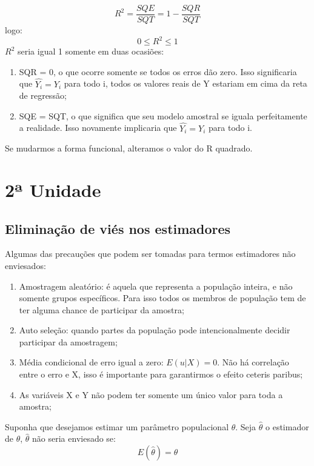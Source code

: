 \documentclass[12pt,a4paper,oneside,brazil]{abntex2}
\begin{document}
 \begin{equation}\label{R quadrado}
 R^2 = \frac{SQE}{SQT} = 1- \frac{SQR}{SQT}
 \end{equation}
 logo:
 \[ 0 \leq R^2 \leq 1\]
 $R^2$ seria igual 1 somente em duas ocasiões:
 \begin{enumerate}
 \item SQR = 0, o que ocorre somente se todos os erros dão zero. Isso significaria que $\hat{Y_i} = Y_i$ para todo i, todos os valores reais de Y estariam em cima da reta de regressão;
 \item SQE = SQT, o que significa que seu modelo amostral se iguala perfeitamente a realidade. Isso novamente implicaria que $\hat{Y_i} = Y_i$ para todo i.
 \end{enumerate}
 
 Se mudarmos a forma funcional, alteramos o valor do R quadrado.

\chapter{2ª Unidade}

\section{Eliminação de viés nos estimadores} 
Algumas das precauções que podem ser tomadas para termos estimadores não enviesados:

\begin{enumerate}
  \item Amostragem aleatório: é aquela que representa a população inteira, e não somente grupos específicos. Para isso todos os membros de  população tem de ter alguma chance de participar da amostra;
  \item Auto seleção: quando partes da população pode intencionalmente decidir participar da amostragem;
  \item Média condicional de erro igual a zero: $E(u|X) = 0$. Não há correlação entre o erro e X, isso é importante para garantirmos o efeito ceteris paribus;
  \item As variáveis X e Y não podem ter somente um único valor para toda a amostra;

\end{enumerate}

Suponha que desejamos estimar um parâmetro populacional $\theta$. Seja $\hat{\theta}$ o estimador de $\theta$, $\hat{\theta}$ não seria enviesado se:
\begin{equation}
    \label{vies}
  E(\hat{\theta}) = \theta
\end{equation}
\end{document}
